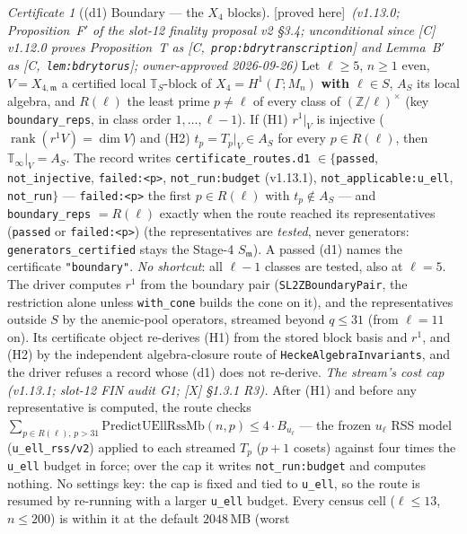 \documentclass[11pt]{article}
\theoremstyle{remark}
\newtheorem{certificate}[theorem]{Certificate}
\newcommand{\Z}{\mathbb{Z}}
\newcommand{\Ga}{\Gamma}
\DeclareMathOperator{\rank}{rank}
\newcommand{\T}{\mathbb{T}}
\newcommand{\m}{\mathfrak{m}}
\newcommand{\Mn}{M_n}
\newcommand{\HA}[1]{[C,~\texttt{#1}]}      %
\newcommand{\PROVED}{\textsf{[proved here]}}
\begin{document}
\begin{certificate}[(d1) Boundary --- the $X_4$ blocks]\label{cert:boundary}\PROVED\ \emph{(v1.13.0;
Proposition~F$'$ of the slot-12 finality proposal v2 \S3.4; unconditional since [C] v1.12.0 proves
Proposition~T as \HA{prop:bdrytranscription} and Lemma~B$'$ as \HA{lem:bdrytorus}; owner-approved
2026-09-26)}
Let $\ell\ge5$, $n\ge1$ even, $V=X_{4,\m}$ a certified local $\T_S$-block of $X_4=H^1(\Ga;\Mn)$
\textbf{with $\ell\in S$}, $A_S$ its local algebra, and $R(\ell)$ the least prime $p\ne\ell$ of every class
of $(\Z/\ell)^{\times}$ (key \texttt{boundary\_reps}, in class order $1,\dots,\ell-1$). If
\textup{(H1)} $r^1|_V$ is injective ($\rank(r^1V)=\dim V$) and \textup{(H2)} $t_p=T_p|_V\in A_S$ for every
$p\in R(\ell)$, then $\T_\infty|_V=A_S$.
The record writes \texttt{certificate\_routes.d1} $\in\{$\texttt{passed}, \texttt{not\_injective},
\texttt{failed:<p>}, \texttt{not\_run:budget} (v1.13.1), \texttt{not\_applicable:u\_ell}, \texttt{not\_run}$\}$ ---
\texttt{failed:<p>} the first $p\in R(\ell)$ with $t_p\notin A_S$ --- and \texttt{boundary\_reps} $=R(\ell)$ exactly
when the route reached its representatives (\texttt{passed} or \texttt{failed:<p>}) (the
representatives are \emph{tested}, never generators: \texttt{generators\_certified} stays the Stage-4
$S_\m$). A passed (d1) names the certificate \texttt{"boundary"}. \emph{No shortcut}: all $\ell-1$ classes
are tested, also at $\ell=5$. The driver computes $r^1$ from the boundary pair
(\texttt{SL2ZBoundaryPair}, the restriction alone unless \texttt{with\_cone} builds the cone on it), and
the representatives outside $S$ by the anemic-pool operators, streamed beyond $q\le31$ (from $\ell=11$
on). Its certificate object re-derives (H1) from the stored block basis and $r^1$, and (H2) by the
independent algebra-closure route of \texttt{HeckeAlgebraInvariants}, and the driver refuses a record
whose (d1) does not re-derive.
\emph{The stream's cost cap (v1.13.1; slot-12 FIN audit G1; [X] \S1.3.1 R3).} After (H1) and before any
representative is computed, the route checks
$\sum_{p\in R(\ell),\,p>31}\mathrm{PredictUEllRssMb}(n,p)\le4\cdot B_{u_\ell}$ --- the frozen $u_\ell$ RSS model
(\texttt{u\_ell\_rss/v2}) applied to each streamed $T_p$ ($p+1$ cosets) against four times the \texttt{u\_ell}
budget in force; over the cap it writes \texttt{not\_run:budget} and computes nothing. No settings key: the
cap is fixed and tied to \texttt{u\_ell}, so the route is resumed by re-running with a larger \texttt{u\_ell}
budget. Every census cell ($\ell\le13$, $n\le200$) is within it at the default $2048$\,MB (worst

\end{certificate}
\end{document}
